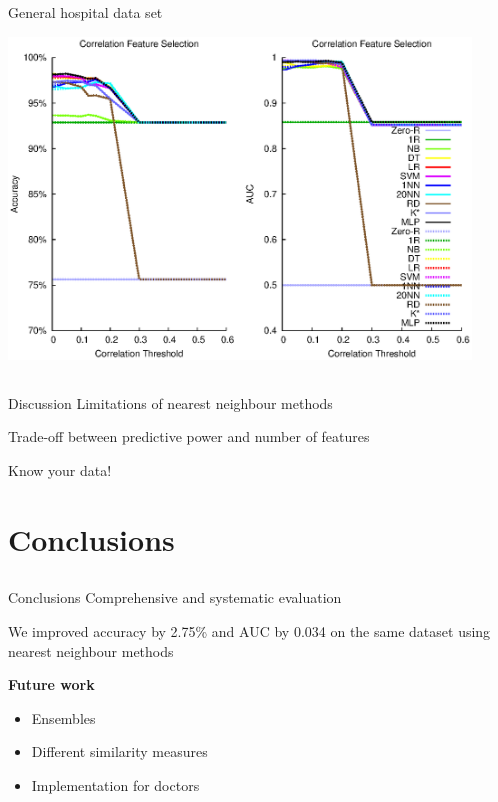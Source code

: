 \documentclass[compress]{beamer}
\begin{document}
\subsection{}
\begin{frame}{General hospital data set}
\begin{center}
\includegraphics[width=0.92\textwidth]{pt-corr.eps}
\end{center}
\end{frame}

\subsection{}
\begin{frame}{Discussion}
Limitations of nearest neighbour methods

\vspace{0.5cm}
Trade-off between predictive power and number of features

\vspace{0.5cm}
Know your data!
\end{frame}

\section{Conclusions}
\subsection{}
\begin{frame}{Conclusions}
Comprehensive and systematic evaluation

\vspace{0.5cm}
We improved accuracy by 2.75\% and AUC by 0.034 on the same dataset using nearest neighbour methods

\pause
\vspace{0.5cm}
\textbf{Future work}
\begin{itemize}
\item Ensembles
\item Different similarity measures
\item Implementation for doctors
\end{itemize}
\end{frame}
\end{document}
